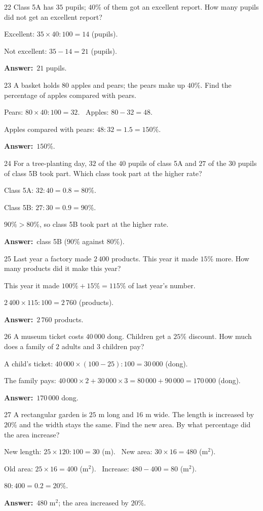 \documentclass[11pt]{article}
\newif\ifsol \solfalse
\providecommand{\AnsWord}{Đáp số}
\newcommand{\dapso}[1]{\par\textbf{\AnsWord:}\ #1}
\newcommand{\probsol}[1]{%
  \begin{lrbox}{\solmeasure}\begin{minipage}{\dimexpr\linewidth-24pt\relax}#1\end{minipage}\end{lrbox}%
  \ifsol
    \begin{solbox}#1\end{solbox}%
  \else
    \setlength{\solht}{\dimexpr\ht\solmeasure+\dp\solmeasure+0.85cm\relax}%
    \ifdim\solht<1.35cm\setlength{\solht}{1.35cm}\fi
    \begin{tcolorbox}[colback=white,colframe=Line,boxrule=0.8pt,arc=5pt,
      left=8pt,right=8pt,top=4pt,bottom=4pt,height=\solht]{\footnotesize\color{Slate}\itshape\WorkWord}\end{tcolorbox}%
  \fi}
\newcommand{\gap}{\vspace{0.3cm}}
\def\WorkWord{Your work:}
\def\AnsWord{Answer}
\begin{document}
\gap
\begin{probbox}{22}{\relax}
Class 5A has $35$ pupils; $40\%$ of them got an excellent report. How many pupils did not get an excellent report?
\end{probbox}
\probsol{
Excellent: $35\times40:100=14$ (pupils).\par
Not excellent: $35-14=21$ (pupils).
\dapso{$21$ pupils.}}
\gap
\begin{probbox}{23}{\relax}
A basket holds $80$ apples and pears; the pears make up $40\%$. Find the percentage of apples compared with pears.
\end{probbox}
\probsol{
Pears: $80\times40:100=32$. \ Apples: $80-32=48$.\par
Apples compared with pears: $48:32=1.5=150\%$.
\dapso{$150\%$.}}
\gap
\begin{probbox}{24}{\relax}
For a tree-planting day, $32$ of the $40$ pupils of class 5A and $27$ of the $30$ pupils of class 5B took part. Which class took part at the higher rate?
\end{probbox}
\probsol{
Class 5A: $32:40=0.8=80\%$.\par
Class 5B: $27:30=0.9=90\%$.\par
$90\%>80\%$, so class 5B took part at the higher rate.
\dapso{class 5B ($90\%$ against $80\%$).}}
\gap
\begin{probbox}{25}{\relax}
Last year a factory made $2\,400$ products. This year it made $15\%$ more. How many products did it make this year?
\end{probbox}
\probsol{
This year it made $100\%+15\%=115\%$ of last year's number.\par
$2\,400\times115:100=2\,760$ (products).
\dapso{$2\,760$ products.}}
\gap
\begin{probbox}{26}{\relax}
A museum ticket costs $40\,000$ dong. Children get a $25\%$ discount. How much does a family of $2$ adults and $3$ children pay?
\end{probbox}
\probsol{
A child's ticket: $40\,000\times(100-25):100=30\,000$ (dong).\par
The family pays: $40\,000\times2+30\,000\times3=80\,000+90\,000=170\,000$ (dong).
\dapso{$170\,000$ dong.}}
\gap
\begin{probbox}{27}{\relax}
A rectangular garden is $25$ m long and $16$ m wide. The length is increased by $20\%$ and the width stays the same. Find the new area. By what percentage did the area increase?
\end{probbox}
\probsol{
New length: $25\times120:100=30$ (m). \ New area: $30\times16=480$ (m$^2$).\par
Old area: $25\times16=400$ (m$^2$). \ Increase: $480-400=80$ (m$^2$).\par
$80:400=0.2=20\%$.
\dapso{$480$ m$^2$; the area increased by $20\%$.}}
\end{document}
